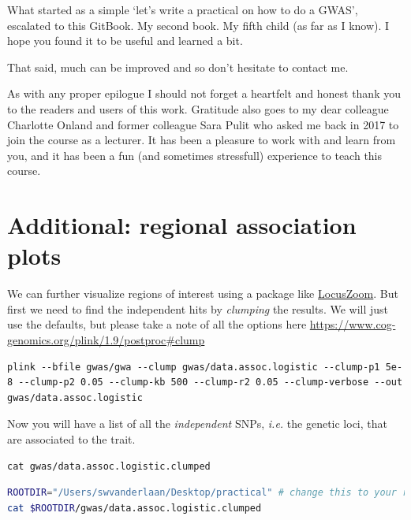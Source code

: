 \documentclass[
]{book}
\begin{document}
What started as a simple `let's write a practical on how to do a GWAS', escalated to this GitBook. My second book. My fifth child (as far as I know). I hope you found it to be useful and learned a bit.

That said, much can be improved and so don't hesitate to contact me.

As with any proper epilogue I should not forget a heartfelt and honest thank you to the readers and users of this work. Gratitude also goes to my dear colleague Charlotte Onland and former colleague Sara Pulit who asked me back in 2017 to join the course as a lecturer. It has been a pleasure to work with and learn from you, and it has been a fun (and sometimes stressfull) experience to teach this course.

\hypertarget{add_chapter_regional_plot}{%
\chapter{Additional: regional association plots}\label{add_chapter_regional_plot}}

We can further visualize regions of interest using a package like \href{http://locuszoom.org}{LocusZoom}. But first we need to find the independent hits by \emph{clumping} the results. We will just use the defaults, but please take a note of all the options here \url{https://www.cog-genomics.org/plink/1.9/postproc\#clump}

\begin{lstlisting}
plink --bfile gwas/gwa --clump gwas/data.assoc.logistic --clump-p1 5e-8 --clump-p2 0.05 --clump-kb 500 --clump-r2 0.05 --clump-verbose --out gwas/data.assoc.logistic
\end{lstlisting}

Now you will have a list of all the \emph{independent} SNPs, \emph{i.e.} the genetic loci, that are associated to the trait.

\begin{lstlisting}
cat gwas/data.assoc.logistic.clumped
\end{lstlisting}

\begin{lstlisting}[language=bash]
ROOTDIR="/Users/swvanderlaan/Desktop/practical" # change this to your root
cat $ROOTDIR/gwas/data.assoc.logistic.clumped
\end{lstlisting}
\end{document}
